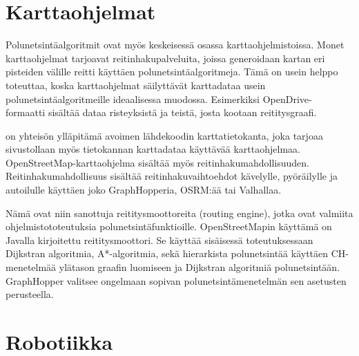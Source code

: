 \section{Karttaohjelmat}\label{karttaohjelmat}
Polunetsintäalgoritmit ovat myös keskeisessä osassa karttaohjelmistoissa. 
Monet karttaohjelmat tarjoavat reitinhakupalveluita, joissa generoidaan kartan  
eri pisteiden välille reitti käyttäen polunetsintäalgoritmeja. Tämä on usein 
helppo toteuttaa, koska karttaohjelmat säilyttävät karttadataa usein 
polunetsintäalgoritmeille ideaalisessa muodossa. Esimerkiksi OpenDrive-
formaatti sisältää dataa risteyksistä ja teistä, josta kootaan 
reititysgraafi.\cite{Lanelet2} \par
	\textcite{OpenStreetMap} on yhteisön ylläpitämä avoimen lähdekoodin 
karttatietokanta, joka tarjoaa sivustollaan myös tietokannan karttadataa 
käyttävää karttaohjelmaa.\cite{OSMAbout} OpenStreetMap-karttaohjelma sisältää 
myös reitinhakumahdollisuuden. Reitinhakumahdollisuus sisältää 
reitinhakuvaihtoehdot kävelylle, pyöräilylle ja autoilulle käyttäen joko 
GraphHopperia, OSRM:ää tai Valhallaa.\cite{OpenStreetMap} \par
	Nämä ovat niin sanottuja reititysmoottoreita (routing engine), jotka 
ovat valmiita ohjelmistototeutuksia polunetsintäfunktioille.\cite{graphhopper} 
OpenStreetMapin käyttämä \textcite{graphhopper} on Javalla kirjoitettu 
reititysmoottori. Se käyttää sisäisessä toteutuksessaan Dijkstran algoritmia, 
A*-algoritmia, sekä hierarkista polunetsintää käyttäen CH-menetelmää ylätason 
graafin luomiseen ja Dijkstran algoritmiä polunetsintään. GraphHopper valitsee 
ongelmaan sopivan polunetsintämenetelmän sen asetusten perusteella.

\section{Robotiikka}\label{robotiikka}
